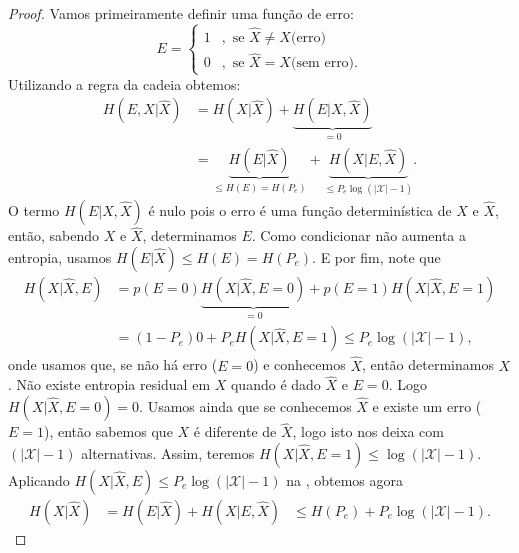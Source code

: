 \begin{proof}
  Vamos primeiramente definir uma função de erro:
  \begin{equation}
    E = \begin{cases} 1 &, \text{ se } \hat{X} \neq X \text{(erro)} \\
                0       &, \text{ se } \hat{X} = X \text{(sem erro)} .
        \end{cases}
  \end{equation}
  Utilizando a regra da cadeia obtemos:
  \begin{subequations}\label{eq:demfanoA}
    \begin{align}
      H(E,X|\hat{X}) &= H(X|\hat{X}) + \underbrace{H(E|X,\hat{X})}_{=0} \\
                     &= \underbrace{H(E|\hat{X})}_{\leq H(E) = H(P_e)} + \underbrace{H(X|E,\hat{X})}_{\leq P_e \log (\vert \mathcal{X} \vert - 1)} .
    \end{align}
  \end{subequations}
  O termo $H(E|X,\hat{X})$ é nulo pois o erro é uma função determinística de $X$ e $\hat{X}$, então, sabendo $X$ e $\hat{X}$, determinamos $E$.
  Como condicionar não aumenta a entropia, usamos $H(E|\hat{X}) \leq H(E) = H(P_e)$.
  E por fim, note que
  \begin{subequations}
    \begin{align}
      H(X|\hat{X},E) &= p(E=0) \underbrace{H(X|\hat{X},E=0)}_{=0} + p(E=1)H(X|\hat{X},E=1) \\
                     &= (1-P_e) 0 + P_e H(X|\hat{X},E=1) \leq P_e \log (\vert \mathcal{X} \vert - 1) ,
    \end{align}
  \end{subequations}
  onde usamos que, se não há erro ($E=0$) e conhecemos $\hat{X}$, então determinamos $X$. Não existe entropia residual em $X$ quando é dado $\hat{X}$ e $E=0$.
  Logo $H(X|\hat{X},E=0)=0$. Usamos ainda que se conhecemos $\hat{X}$ e existe um erro ($E=1$), então sabemos que $X$ é diferente de $\hat{X}$, logo isto nos deixa com $(\vert \mathcal{X} \vert - 1)$ alternativas.
  Assim, teremos $H(X|\hat{X},E=1) \leq \log (\vert \mathcal{X} \vert - 1)$.
  Aplicando $H(X|\hat{X},E) \leq P_e \log (\vert \mathcal{X} \vert - 1)$ na , obtemos agora
  \begin{subequations}\label{eq-hhpelog}
    \begin{align}
      H(X|\hat{X}) &= H(E|\hat{X}) + H(X|E,\hat{X})
                   &\leq H(P_e) + P_e \log (\vert \mathcal{X} \vert - 1) .

\end{align}
\end{subequations}
\end{proof}
